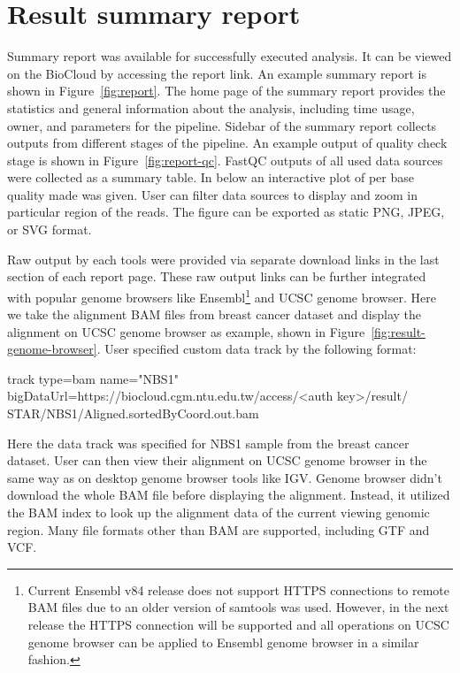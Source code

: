 \section{Result summary report}

Summary report was available for successfully executed analysis. It can be
viewed on the BioCloud by accessing the report link. An example summary report
is shown in Figure~\ref{fig:report}. The home page of the summary report
provides the statistics and general information about the analysis, including
time usage, owner, and parameters for the pipeline. Sidebar of the summary
report collects outputs from different stages of the pipeline. An example output
of quality check stage is shown in Figure~\ref{fig:report-qc}. FastQC outputs
of all used data sources were collected as a summary table. In below an
interactive plot of per base quality made was given. User can filter data
sources to display and zoom in particular region of the reads. The figure can
be exported as static PNG, JPEG, or SVG format.




Raw output by each tools were provided via separate download links in the last
section of each report page. These raw output links can be further integrated
with popular genome browsers like Ensembl\footnote{
    Current Ensembl v84 release does not support HTTPS connections to remote
    BAM files due to an older version of samtools was used. However, in the
    next release the HTTPS connection will be supported and all operations on
    UCSC genome browser can be applied to Ensembl genome browser in a similar
    fashion.
} and UCSC genome browser. Here we take the alignment BAM files from breast cancer
dataset and display the alignment on UCSC genome browser as example, shown in
Figure~\ref{fig:result-genome-browser}. User specified custom data track by the
following format:

\begin{CVerbatim}[fontsize=\small]
track type=bam name="NBS1"
bigDataUrl=https://biocloud.cgm.ntu.edu.tw/access/<auth key>/result/
STAR/NBS1/Aligned.sortedByCoord.out.bam
\end{CVerbatim}

\vspace{-1em}\noindent
Here the data track was specified for NBS1 sample from the breast cancer
dataset. User can then view their alignment on UCSC genome browser in the same
way as on desktop genome browser tools like IGV. Genome browser didn't download
the whole BAM file before displaying the alignment. Instead, it utilized the
BAM index to look up the alignment data of the current viewing genomic region.
Many file formats other than BAM are supported, including GTF and VCF.





